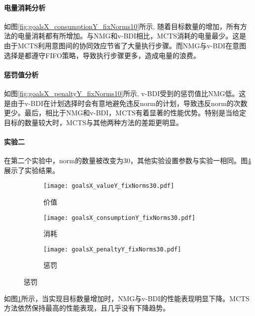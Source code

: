 \paragraph{电量消耗分析}
如图\ref{fig:goalsX_consumptionY_fixNorms10}所示, 随着目标数量的增加，所有方法的电量消耗都有所增加。与NMG和v-BDI相比，MCTS消耗的电量最少。这是由于MCTS利用意图间的协同效应节省了大量执行步骤。而NMG与v-BDI在意图选择是都遵守FIFO策略，导致执行步骤更多，造成电量的浪费。
\paragraph{惩罚值分析}
如图\ref{fig:goalsX_penaltyY_fixNorms10}所示, v-BDI受到的惩罚值比NMG低。这是由于v-BDI在计划选择时会有意地避免违反norm的计划，导致违反norm的次数更少。最后，相比于NMG和v-BDI，MCTS有着显著的性能优势。特别是当给定目标的数量较大时，MCTS与其他两种方法的差距更明显。

\paragraph{实验二}
在第二个实验中，norm的数量被改变为30，其他实验设置参数与实验一相同。图\ref{fig:all_fixNorms30}展示了实验结果。

\begin{figure}
\centering
\begin{subfigure}{.47\textwidth}
  \centering
  \texttt{[image: goalsX\_valueY\_fixNorms30.pdf]}
  \captionsetup{justification=centering}
  \caption{价值}
  \label{fig:goalsX_valueY_fixNorms30}
\end{subfigure}

\begin{subfigure}{.47\textwidth}
  \centering
  \texttt{[image: goalsX\_consumptionY\_fixNorms30.pdf]}
  \captionsetup{justification=centering}
  \caption{消耗}
  \label{fig:goalsX_consumptionY_fixNorms30}
\end{subfigure}
\begin{subfigure}{.47\textwidth}
  \centering
  \texttt{[image: goalsX\_penaltyY\_fixNorms30.pdf]}
  \captionsetup{justification=centering}
  \caption{惩罚}
  \label{fig:goalsX_penaltyY_fixNorms30}
\end{subfigure}
\captionsetup{justification=centering}
\label{fig:all_fixNorms30}
\end{figure}

如图\ref{fig:goalsX_valueY_fixNorms30}所示，当实现目标数量增加时，NMG与v-BDI的性能表现明显下降。MCTS方法依然保持最高的性能表现，且几乎没有下降趋势。

